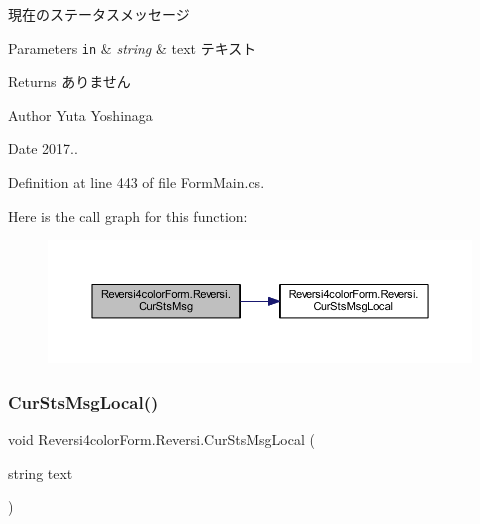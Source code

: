 現在のステータスメッセージ 


\begin{DoxyParams}[1]{Parameters}
\mbox{\tt in}  & {\em string} & text テキスト \\
\hline
\end{DoxyParams}
\begin{DoxyReturn}{Returns}
ありません 
\end{DoxyReturn}
\begin{DoxyAuthor}{Author}
Yuta Yoshinaga 
\end{DoxyAuthor}
\begin{DoxyDate}{Date}
2017.. 
\end{DoxyDate}


Definition at line 443 of file Form\+Main.\+cs.

Here is the call graph for this function\+:
\nopagebreak
\begin{figure}[H]
\begin{center}
\leavevmode
\includegraphics[width=350pt]{class_reversi4color_form_1_1_reversi_af82882188f72f849b21890fe21199083_cgraph}
\end{center}
\end{figure}
\mbox{\label{class_reversi4color_form_1_1_reversi_a663e1d055e099d0855df8a34af31edf9}} 
\subsubsection{\texorpdfstring{Cur\+Sts\+Msg\+Local()}{CurStsMsgLocal()}}
{\footnotesize\ttfamily void Reversi4color\+Form.\+Reversi.\+Cur\+Sts\+Msg\+Local (\begin{DoxyParamCaption}\item[{string}]{text }\end{DoxyParamCaption})}




